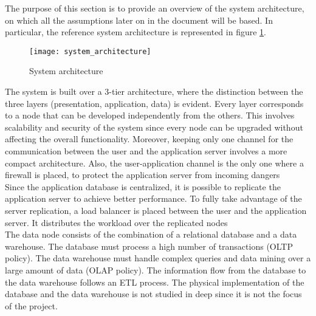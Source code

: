 \documentclass[./main.tex]{subfiles}
\begin{document}
The purpose of this section is to provide an overview of the system architecture,
on which all the assumptions later on in the document will be based. In
particular, the reference system architecture is represented in figure
\ref{fig:system_architecture}.

\begin{figure}[H]
\centering
\texttt{[image: system\_architecture]}
\caption{System architecture}
\label{fig:system_architecture}
\end{figure}

The system is built over a 3-tier architecture, where the distinction between the
three layers (presentation, application, data) is evident. Every layer
corresponds to a node that can be developed independently from the others. This
involves scalability and security of the system since every node can be upgraded
without affecting the overall functionality. Moreover, keeping only one channel
for the communication between the user and the application server involves a more
compact architecture. Also, the user-application channel is the only one where a
firewall is placed, to protect the application server from incoming dangers
\medskip\\
Since the application database is centralized, it is possible to replicate the
application server to achieve better performance. To fully take advantage of the
server replication, a load balancer is placed between the user and the
application server. It distributes the workload over the replicated nodes
\medskip\\
The data node consists of the combination of a relational database and a data
warehouse. The database must process a high number of transactions (OLTP policy).
The data warehouse must handle complex queries and data mining over a large
amount of data (OLAP policy). The information flow from the database to the data
warehouse follows an ETL process. The physical implementation of the database and
the data warehouse is not studied in deep since it is not the focus of the
project.
\end{document}
